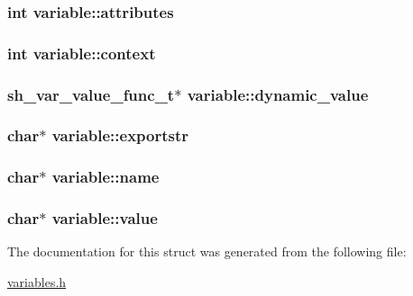 \subsubsection[{\texorpdfstring{attributes}{attributes}}]{\setlength{\rightskip}{0pt plus 5cm}int variable\+::attributes}\hypertarget{structvariable_a32a92c8a80f38048bb2ef8ac0ca2287b}{}\label{structvariable_a32a92c8a80f38048bb2ef8ac0ca2287b}
\subsubsection[{\texorpdfstring{context}{context}}]{\setlength{\rightskip}{0pt plus 5cm}int variable\+::context}\hypertarget{structvariable_a422d2931ad11d1875b0238974ad8f9dd}{}\label{structvariable_a422d2931ad11d1875b0238974ad8f9dd}
\subsubsection[{\texorpdfstring{dynamic\+\_\+value}{dynamic_value}}]{\setlength{\rightskip}{0pt plus 5cm}sh\+\_\+var\+\_\+value\+\_\+func\+\_\+t$\ast$ variable\+::dynamic\+\_\+value}\hypertarget{structvariable_a93d9b7d062815920f1de93aee1d154ad}{}\label{structvariable_a93d9b7d062815920f1de93aee1d154ad}
\subsubsection[{\texorpdfstring{exportstr}{exportstr}}]{\setlength{\rightskip}{0pt plus 5cm}char$\ast$ variable\+::exportstr}\hypertarget{structvariable_a82a15a94556a4eb824687c5d3fb81eb2}{}\label{structvariable_a82a15a94556a4eb824687c5d3fb81eb2}
\subsubsection[{\texorpdfstring{name}{name}}]{\setlength{\rightskip}{0pt plus 5cm}char$\ast$ variable\+::name}\hypertarget{structvariable_a1cd70c44962eefd96c2f97444f004946}{}\label{structvariable_a1cd70c44962eefd96c2f97444f004946}
\subsubsection[{\texorpdfstring{value}{value}}]{\setlength{\rightskip}{0pt plus 5cm}char$\ast$ variable\+::value}\hypertarget{structvariable_a1f8e26d6efb860cfa550220991627bd8}{}\label{structvariable_a1f8e26d6efb860cfa550220991627bd8}


The documentation for this struct was generated from the following file\+:\begin{DoxyCompactItemize}
\item 
\hyperlink{variables_8h}{variables.\+h}\end{DoxyCompactItemize}
